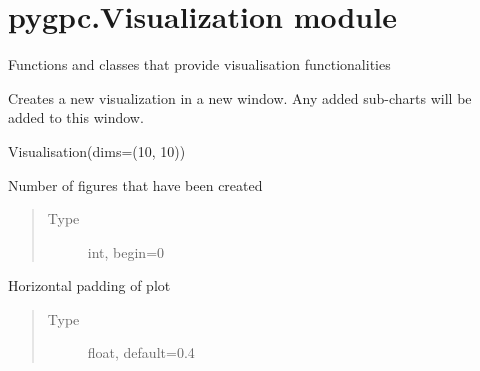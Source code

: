 \documentclass[letterpaper,10pt,english,openany,oneside]{sphinxmanual}
\begin{document}
\section{pygpc.Visualization module}
\label{\detokenize{pygpc:module-pygpc.Visualization}}\label{\detokenize{pygpc:pygpc-visualization-module}}
Functions and classes that provide visualisation functionalities

\begin{fulllineitems}
\label{\detokenize{pygpc:pygpc.Visualization.Visualization}}
Creates a new visualization in a new window. Any added sub-charts will be added to this window.

Visualisation(dims=(10, 10))

\begin{fulllineitems}
\label{\detokenize{pygpc:pygpc.Visualization.Visualization.Visualisation.figure_number}}
Number of figures that have been created
\begin{quote}\begin{description}
\item[{Type}] \leavevmode
int, begin=0

\end{description}\end{quote}

\end{fulllineitems}


\begin{fulllineitems}
\label{\detokenize{pygpc:pygpc.Visualization.Visualization.Visualisation.horizontal_padding}}
Horizontal padding of plot
\begin{quote}\begin{description}
\item[{Type}] \leavevmode
float, default=0.4

\end{description}\end{quote}


\end{fulllineitems}
\end{fulllineitems}
\end{document}
